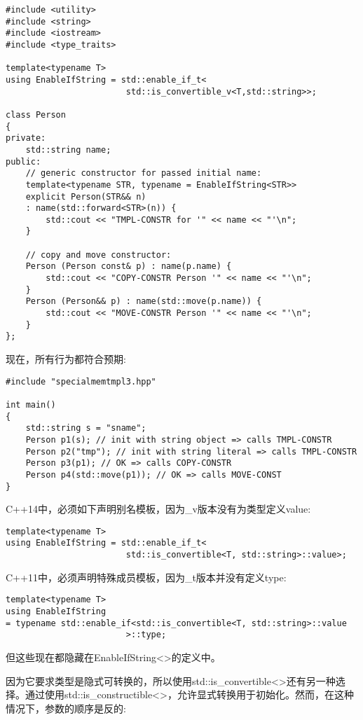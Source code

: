 \begin{lstlisting}[style=styleCXX]
#include <utility>
#include <string>
#include <iostream>
#include <type_traits>

template<typename T>
using EnableIfString = std::enable_if_t<
						std::is_convertible_v<T,std::string>>;

class Person
{
private:
	std::string name;
public:
	// generic constructor for passed initial name:
	template<typename STR, typename = EnableIfString<STR>>
	explicit Person(STR&& n)
	: name(std::forward<STR>(n)) {
		std::cout << "TMPL-CONSTR for '" << name << "'\n";
	}

	// copy and move constructor:
	Person (Person const& p) : name(p.name) {
		std::cout << "COPY-CONSTR Person '" << name << "'\n";
	}
	Person (Person&& p) : name(std::move(p.name)) {
		std::cout << "MOVE-CONSTR Person '" << name << "'\n";
	}
};
\end{lstlisting}

现在，所有行为都符合预期:

\begin{lstlisting}[style=styleCXX]
#include "specialmemtmpl3.hpp"

int main()
{
	std::string s = "sname";
	Person p1(s); // init with string object => calls TMPL-CONSTR
	Person p2("tmp"); // init with string literal => calls TMPL-CONSTR
	Person p3(p1); // OK => calls COPY-CONSTR
	Person p4(std::move(p1)); // OK => calls MOVE-CONST
}
\end{lstlisting}

C++14中，必须如下声明别名模板，因为\_v版本没有为类型定义value:

\begin{lstlisting}[style=styleCXX]
template<typename T>
using EnableIfString = std::enable_if_t<
						std::is_convertible<T, std::string>::value>;
\end{lstlisting}

C++11中，必须声明特殊成员模板，因为\_t版本并没有定义type:

\begin{lstlisting}[style=styleCXX]
template<typename T>
using EnableIfString
= typename std::enable_if<std::is_convertible<T, std::string>::value
						>::type;
\end{lstlisting}

但这些现在都隐藏在EnableIfString<>的定义中。

因为它要求类型是隐式可转换的，所以使用std::is\_convertible<>还有另一种选择。通过使用std::is\_constructible<>，允许显式转换用于初始化。然而，在这种情况下，参数的顺序是反的:

